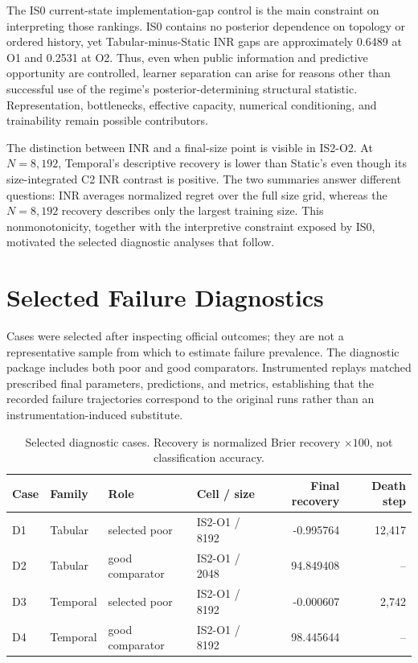 \documentclass[11pt]{article}
\begin{document}
The IS0 current-state implementation-gap control is the main constraint on interpreting those rankings. IS0 contains no posterior dependence on topology or ordered history, yet Tabular-minus-Static INR gaps are approximately 0.6489 at O1 and 0.2531 at O2. Thus, even when public information and predictive opportunity are controlled, learner separation can arise for reasons other than successful use of the regime's posterior-determining structural statistic. Representation, bottlenecks, effective capacity, numerical conditioning, and trainability remain possible contributors.

The distinction between INR and a final-size point is visible in IS2-O2. At $N=8{,}192$, Temporal's descriptive recovery is lower than Static's even though its size-integrated C2 INR contrast is positive. The two summaries answer different questions: INR averages normalized regret over the full size grid, whereas the $N=8{,}192$ recovery describes only the largest training size. This nonmonotonicity, together with the interpretive constraint exposed by IS0, motivated the selected diagnostic analyses that follow.

\section{Selected Failure Diagnostics}\label{sec:failure}

Cases were selected after inspecting official outcomes; they are not a representative sample from which to estimate failure prevalence. The diagnostic package includes both poor and good comparators. Instrumented replays matched prescribed final parameters, predictions, and metrics, establishing that the recorded failure trajectories correspond to the original runs rather than an instrumentation-induced substitute.

\begin{table}[t]
\centering
\caption{Selected diagnostic cases. Recovery is normalized Brier recovery $\times100$, not classification accuracy.}
\label{tab:cases}
\small
\begin{tabular}{llllrr}
\toprule
Case & Family & Role & Cell / size & Final recovery & Death step \\
\midrule
D1 & Tabular & selected poor & IS2-O1 / 8192 & -0.995764 & 12,417 \\
D2 & Tabular & good comparator & IS2-O1 / 2048 & 94.849408 & -- \\
D3 & Temporal & selected poor & IS2-O1 / 8192 & -0.000607 & 2,742 \\
D4 & Temporal & good comparator & IS2-O1 / 8192 & 98.445644 & -- \\
\bottomrule
\end{tabular}
\end{table}
\end{document}
